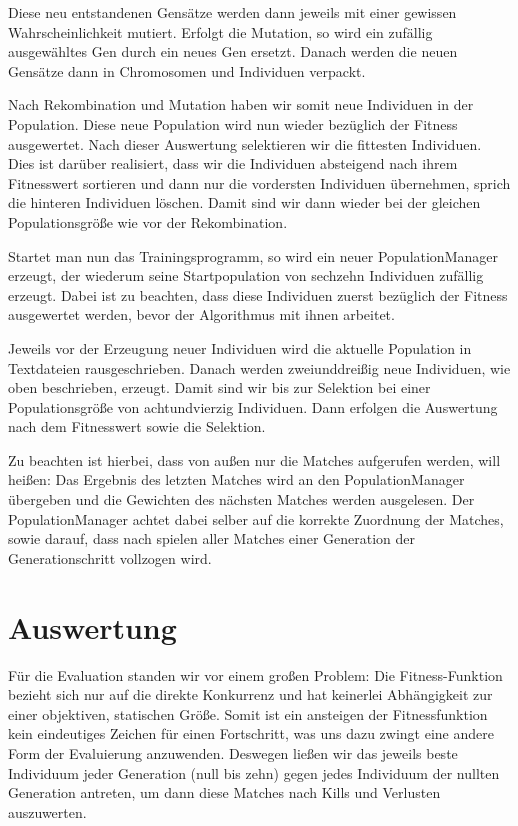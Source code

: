 \documentclass[
	12pt,
	a4paper,
	BCOR10mm,
	DIV14,
	headsepline,
	usegeometry,
]{scrreprt}
\begin{document}
Diese neu entstandenen Gensätze werden dann jeweils mit einer gewissen Wahrscheinlichkeit mutiert.
Erfolgt die Mutation, so wird ein zufällig ausgewähltes Gen durch ein neues Gen ersetzt.
Danach werden die neuen Gensätze dann in Chromosomen und Individuen verpackt.

Nach Rekombination und Mutation haben wir somit neue Individuen in der Population.
Diese neue Population wird nun wieder bezüglich der Fitness ausgewertet.
Nach dieser Auswertung selektieren wir die fittesten Individuen.
Dies ist darüber realisiert, dass wir die Individuen absteigend nach ihrem Fitnesswert sortieren und dann nur die vordersten Individuen übernehmen, sprich die hinteren Individuen löschen.
Damit sind wir dann wieder bei der gleichen Populationsgröße wie vor der Rekombination.

Startet man nun das Trainingsprogramm, so wird ein neuer PopulationManager erzeugt, der wiederum seine Startpopulation von sechzehn Individuen zufällig erzeugt.
Dabei ist zu beachten, dass diese Individuen zuerst bezüglich der Fitness ausgewertet werden, bevor der Algorithmus mit ihnen arbeitet.

Jeweils vor der Erzeugung neuer Individuen wird die aktuelle Population in Textdateien rausgeschrieben.
Danach werden zweiunddreißig neue Individuen, wie oben beschrieben, erzeugt.
Damit sind wir bis zur Selektion bei einer Populationsgröße von achtundvierzig Individuen.
Dann erfolgen die Auswertung nach dem Fitnesswert sowie die Selektion.

Zu beachten ist hierbei, dass von außen nur die Matches aufgerufen werden, will heißen: Das Ergebnis des letzten Matches wird an den PopulationManager übergeben und die Gewichten des nächsten Matches werden ausgelesen.
Der PopulationManager achtet dabei selber auf die korrekte Zuordnung der Matches, sowie darauf, dass nach spielen aller Matches einer Generation der Generationschritt vollzogen wird.

\chapter{Auswertung}
\label{Auswertung}
Für die Evaluation standen wir vor einem großen Problem: Die Fitness-Funktion bezieht sich nur auf die direkte Konkurrenz und hat keinerlei Abhängigkeit zur einer objektiven, statischen Größe.
Somit ist ein ansteigen der Fitnessfunktion kein eindeutiges Zeichen für einen Fortschritt, was uns dazu zwingt eine andere Form der Evaluierung anzuwenden.
Deswegen ließen wir das jeweils beste Individuum jeder Generation (null bis zehn) gegen jedes Individuum der nullten Generation antreten, um dann diese Matches nach Kills und Verlusten auszuwerten.
\end{document}
